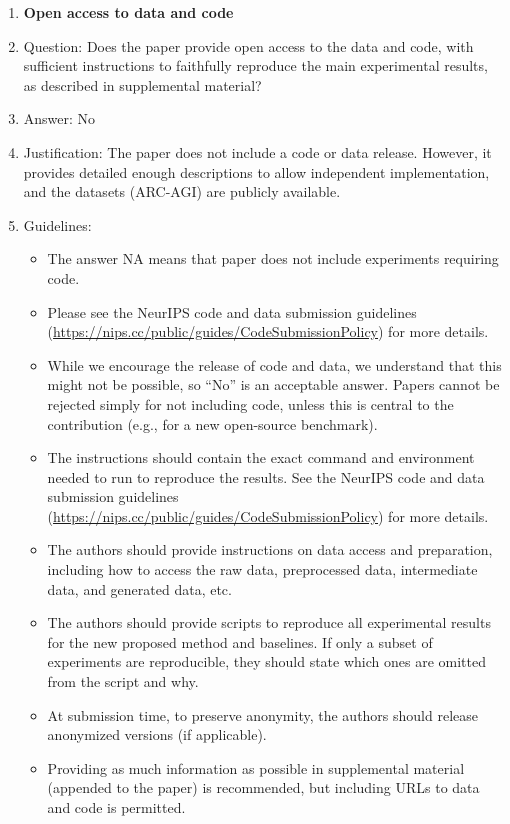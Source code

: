 \documentclass{article}
\newcommand{\answerNo}[1][]{No}
\begin{document}
\begin{enumerate}
\item {\bf Open access to data and code}
    \item[] Question: Does the paper provide open access to the data and code, with sufficient instructions to faithfully reproduce the main experimental results, as described in supplemental material?
    \item[] Answer: \answerNo{}
    \item[] Justification: The paper does not include a code or data release. However, it provides detailed enough descriptions to allow independent implementation, and the datasets (ARC-AGI) are publicly available.
    \item[] Guidelines:
    \begin{itemize}
        \item The answer NA means that paper does not include experiments requiring code.
        \item Please see the NeurIPS code and data submission guidelines (\url{https://nips.cc/public/guides/CodeSubmissionPolicy}) for more details.
        \item While we encourage the release of code and data, we understand that this might not be possible, so “No” is an acceptable answer. Papers cannot be rejected simply for not including code, unless this is central to the contribution (e.g., for a new open-source benchmark).
        \item The instructions should contain the exact command and environment needed to run to reproduce the results. See the NeurIPS code and data submission guidelines (\url{https://nips.cc/public/guides/CodeSubmissionPolicy}) for more details.
        \item The authors should provide instructions on data access and preparation, including how to access the raw data, preprocessed data, intermediate data, and generated data, etc.
        \item The authors should provide scripts to reproduce all experimental results for the new proposed method and baselines. If only a subset of experiments are reproducible, they should state which ones are omitted from the script and why.
        \item At submission time, to preserve anonymity, the authors should release anonymized versions (if applicable).
        \item Providing as much information as possible in supplemental material (appended to the paper) is recommended, but including URLs to data and code is permitted.
    \end{itemize}


\end{enumerate}
\end{document}
